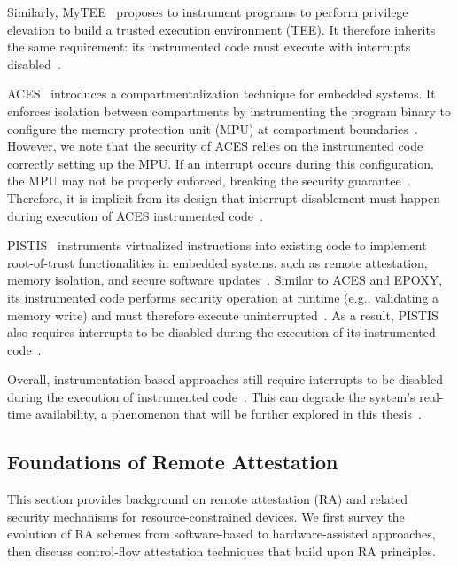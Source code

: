 \documentclass[a4paper,10pt]{article}
\begin{document}
Similarly, MyTEE~\cite{wang2022mytee} proposes to instrument programs to perform privilege elevation to build a trusted execution environment (TEE). It therefore inherits the same requirement: its instrumented code must execute with interrupts disabled~\cite{wang2022mytee}.

ACES~\cite{nunes2019aces} introduces a compartmentalization technique for embedded systems.
It enforces isolation between compartments by instrumenting the program binary to configure the memory protection unit (MPU) at compartment boundaries~\cite{nunes2019aces}.
However, we note that the security of ACES relies on the instrumented code correctly setting up the MPU. 
If an interrupt occurs during this configuration, the MPU may not be properly enforced, breaking the security guarantee~\cite{nunes2019aces}. 
Therefore, it is implicit from its design that interrupt disablement must happen during execution of ACES instrumented code~\cite{nunes2019aces}.

PISTIS~\cite{nunes2021pistis} instruments virtualized instructions into existing code to implement root-of-trust functionalities in embedded systems, such as remote attestation, memory isolation, and secure software updates~\cite{nunes2021pistis}.
Similar to ACES and EPOXY, its instrumented code performs security operation at runtime (e.g., validating a memory write) and must therefore execute uninterrupted~\cite{nunes2021pistis}.
As a result, PISTIS also requires interrupts to be disabled during the execution of its instrumented code~\cite{nunes2021pistis}.

Overall, instrumentation-based approaches still require interrupts to be disabled during the execution of instrumented code~\cite{li2017epoxy,nunes2019aces,nunes2021pistis,wang2022mytee}.
This can degrade the system's real-time availability, a phenomenon that will be further explored in this thesis~\cite{li2017epoxy,nunes2019aces,nunes2021pistis,wang2022mytee}.



\subsection{Foundations of Remote Attestation}

This section provides background on remote attestation (RA) and
related security mechanisms for resource-constrained devices. We
first survey the evolution of RA schemes from software-based to
hardware-assisted approaches, then discuss control-flow
attestation techniques that build upon RA principles.
\end{document}
